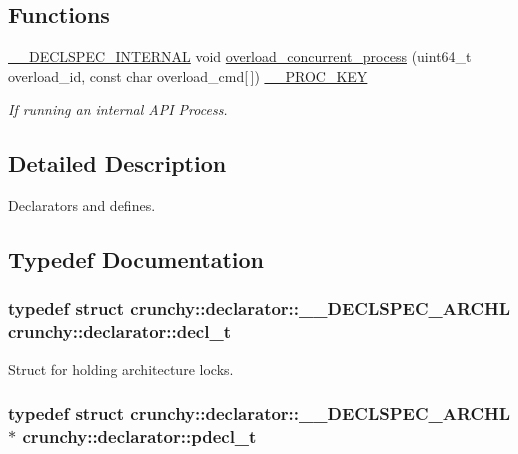 \subsection*{Functions}
\begin{DoxyCompactItemize}
\item 
\hyperlink{_c_r_h___declspec_8h_add2c9e5146b4eb6fdda70423049d29a4}{\+\_\+\+\_\+\+D\+E\+C\+L\+S\+P\+E\+C\+\_\+\+I\+N\+T\+E\+R\+N\+AL} void \hyperlink{namespacecrunchy_1_1declarator_a183d3307eeea9d174913148d0d7a7070}{overload\+\_\+concurrent\+\_\+process} (uint64\+\_\+t overload\+\_\+id, const char overload\+\_\+cmd\mbox{[}$\,$\mbox{]}) \hyperlink{_c_r_h___declspec_8h_a5cb3eb2befb32ab660d50324fa01a36c}{\+\_\+\+\_\+\+P\+R\+O\+C\+\_\+\+K\+EY}
\begin{DoxyCompactList}\small\item\em If running an internal A\+PI Process. \end{DoxyCompactList}\end{DoxyCompactItemize}


\subsection{Detailed Description}
Declarators and defines. 

\subsection{Typedef Documentation}
\subsubsection[{decl\+\_\+t}]{\setlength{\rightskip}{0pt plus 5cm}typedef struct {\bf crunchy\+::declarator\+::\+\_\+\+\_\+\+D\+E\+C\+L\+S\+P\+E\+C\+\_\+\+A\+R\+C\+HL}  {\bf crunchy\+::declarator\+::decl\+\_\+t}}\hypertarget{namespacecrunchy_1_1declarator_a0f9bbabe1552349f0ee0ae228ed30bb2}{}\label{namespacecrunchy_1_1declarator_a0f9bbabe1552349f0ee0ae228ed30bb2}


Struct for holding architecture locks. 

\subsubsection[{pdecl\+\_\+t}]{\setlength{\rightskip}{0pt plus 5cm}typedef struct {\bf crunchy\+::declarator\+::\+\_\+\+\_\+\+D\+E\+C\+L\+S\+P\+E\+C\+\_\+\+A\+R\+C\+HL} $\ast$ {\bf crunchy\+::declarator\+::pdecl\+\_\+t}}\hypertarget{namespacecrunchy_1_1declarator_a518adbd030268ca7f676cfe5c5ee7624}{}\label{namespacecrunchy_1_1declarator_a518adbd030268ca7f676cfe5c5ee7624}


